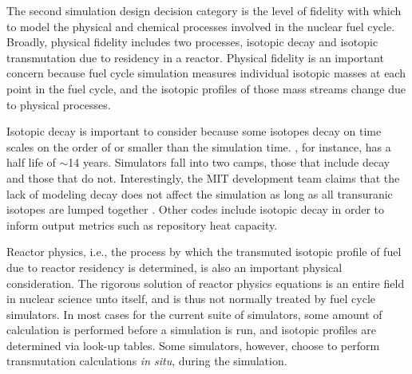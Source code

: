 The second simulation design decision category is the level of fidelity with
which to model the physical and chemical processes involved in the nuclear fuel
cycle. Broadly, physical fidelity includes two processes, isotopic decay and
isotopic transmutation due to residency in a reactor. Physical fidelity is an
important concern because fuel cycle simulation measures individual isotopic
masses at each point in the fuel cycle, and the isotopic profiles of those mass
streams change due to physical processes. 

Isotopic decay is important to consider because some isotopes decay on time
scales on the order of or smaller than the simulation time. , for
instance, has a half life of $\sim$14 years. Simulators fall into two camps,
those that include decay and those that do not. Interestingly, the MIT
development team claims that the lack of modeling decay does not affect the
simulation as long as all transuranic isotopes are lumped together
\cite{guerin_impact_2009}. Other codes include isotopic decay in order to inform
output metrics such as repository heat capacity.

Reactor physics, i.e., the process by which the transmuted isotopic profile of
fuel due to reactor residency is determined, is also an important physical
consideration. The rigorous solution of reactor physics equations is an entire
field in nuclear science unto itself, and is thus not normally treated by fuel
cycle simulators. In most cases for the current suite of simulators, some amount
of calculation is performed before a simulation is run, and isotopic profiles
are determined via look-up tables. Some simulators, however, choose to perform
transmutation calculations \textit{in situ}, during the simulation.

